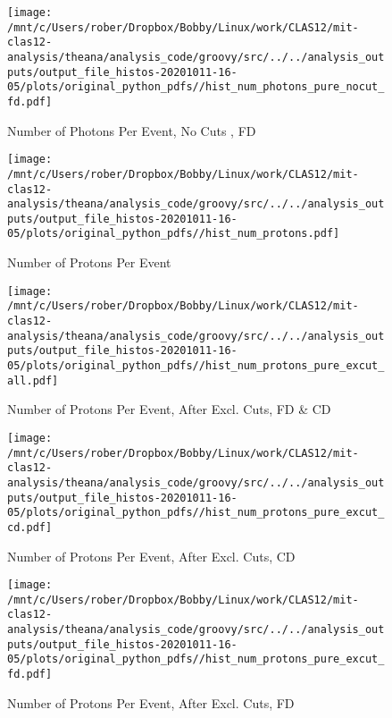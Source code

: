\documentclass{article}
\begin{document}
\begin{landscape}
\begin{figure}[h]
        \texttt{[image: /mnt/c/Users/rober/Dropbox/Bobby/Linux/work/CLAS12/mit-clas12-analysis/theana/analysis\_code/groovy/src/../../analysis\_outputs/output\_file\_histos-20201011-16-05/plots/original\_python\_pdfs//hist\_num\_photons\_pure\_nocut\_fd.pdf]}
        \captionsetup{textformat=empty,labelformat=blank}
        \caption{Number of Photons Per Event, No Cuts , FD}
    \end{figure}
    \clearpage
    
    \begin{figure}[h]
        \centering

        \texttt{[image: /mnt/c/Users/rober/Dropbox/Bobby/Linux/work/CLAS12/mit-clas12-analysis/theana/analysis\_code/groovy/src/../../analysis\_outputs/output\_file\_histos-20201011-16-05/plots/original\_python\_pdfs//hist\_num\_protons.pdf]}
        \captionsetup{textformat=empty,labelformat=blank}
        \caption{Number of Protons Per Event}
    \end{figure}
    \clearpage
    
    \begin{figure}[h]
        \centering

        \texttt{[image: /mnt/c/Users/rober/Dropbox/Bobby/Linux/work/CLAS12/mit-clas12-analysis/theana/analysis\_code/groovy/src/../../analysis\_outputs/output\_file\_histos-20201011-16-05/plots/original\_python\_pdfs//hist\_num\_protons\_pure\_excut\_all.pdf]}
        \captionsetup{textformat=empty,labelformat=blank}
        \caption{Number of Protons Per Event, After Excl. Cuts, FD \& CD}
    \end{figure}
    \clearpage
    
    \begin{figure}[h]
        \centering

        \texttt{[image: /mnt/c/Users/rober/Dropbox/Bobby/Linux/work/CLAS12/mit-clas12-analysis/theana/analysis\_code/groovy/src/../../analysis\_outputs/output\_file\_histos-20201011-16-05/plots/original\_python\_pdfs//hist\_num\_protons\_pure\_excut\_cd.pdf]}
        \captionsetup{textformat=empty,labelformat=blank}
        \caption{Number of Protons Per Event, After Excl. Cuts, CD}
    \end{figure}
    \clearpage
    
    \begin{figure}[h]
        \centering

        \texttt{[image: /mnt/c/Users/rober/Dropbox/Bobby/Linux/work/CLAS12/mit-clas12-analysis/theana/analysis\_code/groovy/src/../../analysis\_outputs/output\_file\_histos-20201011-16-05/plots/original\_python\_pdfs//hist\_num\_protons\_pure\_excut\_fd.pdf]}
        \captionsetup{textformat=empty,labelformat=blank}
        \caption{Number of Protons Per Event, After Excl. Cuts, FD}
    \end{figure}
    \clearpage
    

\end{landscape}
\end{document}
